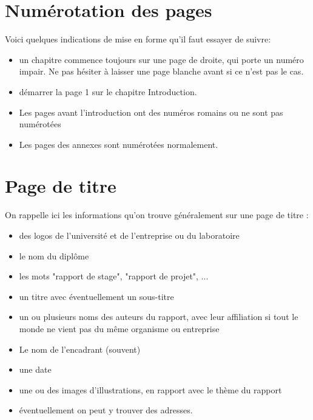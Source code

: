 \section{Numérotation des pages}


Voici quelques indications de mise en forme  qu'il faut essayer de suivre:

\begin{itemize}

\item un chapitre commence toujours sur une page de droite, qui porte un numéro impair. Ne pas hésiter à laisser une page blanche avant si ce n'est pas le cas.

\item  démarrer la page 1 sur le chapitre Introduction.

\item Les pages avant l'introduction ont des numéros romains ou  ne sont pas numérotées

\item Les pages des annexes sont numérotées normalement.

\end{itemize}


\section{Page de titre}
On rappelle ici les informations  qu'on trouve généralement sur une page de titre :
\begin{itemize}
\item des logos de l'université et de l'entreprise ou du laboratoire
\item le nom du diplôme
\item les mots "rapport de stage", "rapport de projet", ...
\item un titre avec éventuellement un sous-titre
\item un ou plusieurs noms des auteurs du rapport, avec leur affiliation si tout le monde ne vient pas du
même organisme ou entreprise
\item Le nom de l'encadrant (souvent)
\item une date
\item une ou des images d'illustrations, en rapport avec le thème du rapport
\item éventuellement on peut y trouver des adresses.
\end{itemize}




